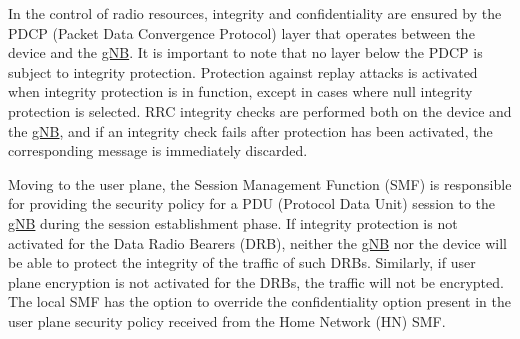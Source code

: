 \documentclass[english]{article}
\begin{document}
In the control of radio resources, integrity and confidentiality are ensured by
the PDCP (Packet Data Convergence Protocol) layer that operates between the
device and the \hyperlink{gNB}{gNB}. It is important to note that no layer
below the PDCP is subject to integrity protection. Protection against replay
attacks is activated when integrity protection is in function, except in cases
where null integrity protection is selected. RRC integrity checks are performed
both on the device and the \hyperlink{gNB}{gNB}, and if an integrity check
fails after protection has been activated, the corresponding message is
immediately discarded.

Moving to the user plane, the Session Management Function (SMF) is responsible
for providing the security policy for a PDU (Protocol Data Unit) session to the
\hyperlink{gNB}{gNB} during the session establishment phase. If integrity
protection is not activated for the Data Radio Bearers (DRB), neither the
\hyperlink{gNB}{gNB} nor the device will be able to protect the integrity of
the traffic of such DRBs. Similarly, if user plane encryption is not activated
for the DRBs, the traffic will not be encrypted. The local SMF has the option
to override the confidentiality option present in the user plane security
policy received from the Home Network (HN) SMF.\@
\end{document}
